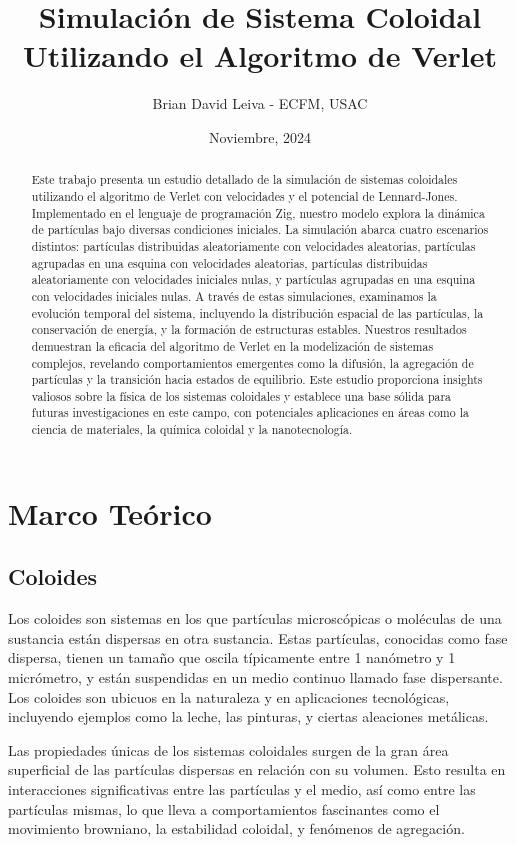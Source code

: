 \documentclass[twocolumn]{article}
\title{Simulación de Sistema Coloidal Utilizando el Algoritmo de Verlet}
\author{Brian David Leiva - ECFM, USAC}
\date{Noviembre, 2024}
\begin{document}
\maketitle

\begin{abstract}
Este trabajo presenta un estudio detallado de la simulación de sistemas coloidales utilizando el algoritmo de Verlet con velocidades y el potencial de Lennard-Jones. Implementado en el lenguaje de programación Zig, nuestro modelo explora la dinámica de partículas bajo diversas condiciones iniciales. La simulación abarca cuatro escenarios distintos: partículas distribuidas aleatoriamente con velocidades aleatorias, partículas agrupadas en una esquina con velocidades aleatorias, partículas distribuidas aleatoriamente con velocidades iniciales nulas, y partículas agrupadas en una esquina con velocidades iniciales nulas. A través de estas simulaciones, examinamos la evolución temporal del sistema, incluyendo la distribución espacial de las partículas, la conservación de energía, y la formación de estructuras estables. Nuestros resultados demuestran la eficacia del algoritmo de Verlet en la modelización de sistemas complejos, revelando comportamientos emergentes como la difusión, la agregación de partículas y la transición hacia estados de equilibrio. Este estudio proporciona insights valiosos sobre la física de los sistemas coloidales y establece una base sólida para futuras investigaciones en este campo, con potenciales aplicaciones en áreas como la ciencia de materiales, la química coloidal y la nanotecnología.
\end{abstract}

\section{Marco Teórico}
\subsection*{Coloides}
Los coloides son sistemas en los que partículas microscópicas o moléculas de una sustancia están dispersas en otra sustancia. Estas partículas, conocidas como fase dispersa, tienen un tamaño que oscila típicamente entre 1 nanómetro y 1 micrómetro, y están suspendidas en un medio continuo llamado fase dispersante. Los coloides son ubicuos en la naturaleza y en aplicaciones tecnológicas, incluyendo ejemplos como la leche, las pinturas, y ciertas aleaciones metálicas.

Las propiedades únicas de los sistemas coloidales surgen de la gran área superficial de las partículas dispersas en relación con su volumen. Esto resulta en interacciones significativas entre las partículas y el medio, así como entre las partículas mismas, lo que lleva a comportamientos fascinantes como el movimiento browniano, la estabilidad coloidal, y fenómenos de agregación.
\end{document}
